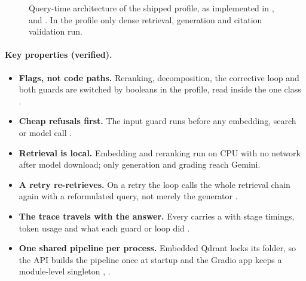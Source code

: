 \begin{figure}[htbp]
{}
\caption{Query-time architecture of the shipped  profile, as implemented in ,  and . In the  profile only dense retrieval, generation and citation validation run.}
\label{fig:arch-query}
\end{figure}

\paragraph{Key properties (verified).}
\begin{itemize}
  \item \textbf{Flags, not code paths.} Reranking, decomposition, the corrective loop and both guards are switched by booleans in the profile, read inside the one  class .
  \item \textbf{Cheap refusals first.} The input guard runs before any embedding, search or model call .
  \item \textbf{Retrieval is local.} Embedding and reranking run on CPU with no network after model download; only generation and grading reach Gemini.
  \item \textbf{A retry re-retrieves.} On a retry the loop calls the whole retrieval chain again with a reformulated query, not merely the generator .
  \item \textbf{The trace travels with the answer.} Every  carries a  with stage timings, token usage and what each guard or loop did .
  \item \textbf{One shared pipeline per process.} Embedded Qdrant locks its folder, so the API builds the pipeline once at startup and the Gradio app keeps a module-level singleton , .
\end{itemize}


